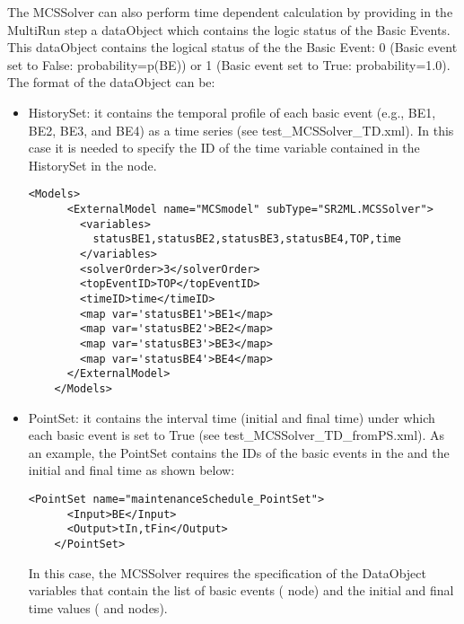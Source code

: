 The MCSSolver can also perform time dependent calculation by providing in the MultiRun step a dataObject which
contains the logic status of the Basic Events.
This dataObject contains the logical status of the the Basic Event: 0 (Basic event set to False: probability=p(BE)) 
or 1 (Basic event set to True: probability=1.0).
The format of the dataObject can be:
\begin{itemize}
  \item HistorySet: it contains the temporal profile of each basic event (e.g., BE1, BE2, BE3, and BE4) as a time 
                    series (see test\_MCSSolver\_TD.xml). In this case it is needed to specify the ID of the time variable 
                    contained in the HistorySet in the  node.
  
   \begin{lstlisting}[style=XML,morekeywords={anAttribute},caption=Time dependent (from HistorySet) MCSSolver model input example., label=lst:MCSSolver_InputExample]
     <Models>
      <ExternalModel name="MCSmodel" subType="SR2ML.MCSSolver">
        <variables>
          statusBE1,statusBE2,statusBE3,statusBE4,TOP,time
        </variables>
        <solverOrder>3</solverOrder>
        <topEventID>TOP</topEventID>
        <timeID>time</timeID>
        <map var='statusBE1'>BE1</map>
        <map var='statusBE2'>BE2</map>
        <map var='statusBE3'>BE3</map>
        <map var='statusBE4'>BE4</map>
      </ExternalModel>
    </Models>
  \end{lstlisting}
  
  \item PointSet: it contains the interval time (initial and final time) under which each basic event is set to 
                  True (see test\_MCSSolver\_TD\_fromPS.xml). As an example, the PointSet contains the IDs of the basic events
                  in the and the initial and final time as shown below:
                  
   \begin{lstlisting}[style=XML,morekeywords={anAttribute},caption= Example of PointSet for time dependent MCSSolver calculation., label=lst:MCSSolver_InputExample]
    <PointSet name="maintenanceSchedule_PointSet">
      <Input>BE</Input>
      <Output>tIn,tFin</Output>
    </PointSet>
    \end{lstlisting}
    
                  In this case, the MCSSolver requires the specification of the DataObject variables that contain the list of basic events
                  ( node) and the initial and final time values ( and  nodes).
                  

\end{itemize}
